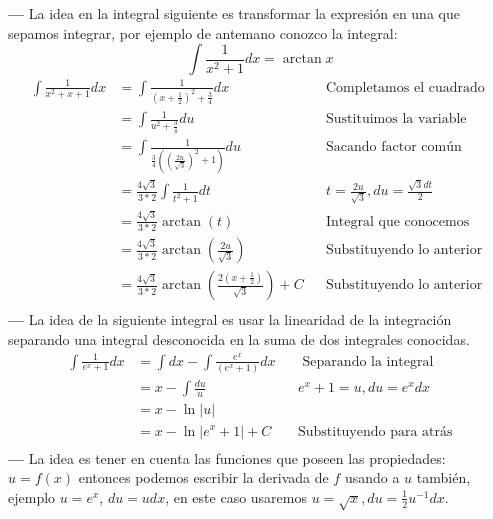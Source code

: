\documentclass[14pt]{extarticle}
\begin{document}
\textbf{---} La idea en la integral siguiente es transformar la expresión en una que sepamos integrar, por ejemplo de antemano conozco la integral: $$\int \frac{1}{x^2+1}dx = \arctan{x}$$
\begin{align}
      \int \frac{1}{x^2+x+1} dx
       & = \int \frac{1}{(x+\frac{1}{2})^2+\frac{3}{4}}dx                           &  & \text{Completamos el cuadrado }                             \\
       & = \int \frac{1}{u^2+\frac{3}{4}}du                                         &  & \text{Sustituimos la variable}                              \\
       & = \int \frac{1}{ \frac{3}{4} \left( (\frac{2u}{\sqrt 3})^2 + 1 \right) }du &  & \text{Sacando factor común}                                 \\
       & = \frac{4\sqrt{3}}{3*2} \int \frac{1}{t^2+1}dt                             &  & \text{$t = \frac{2u}{\sqrt{3}}, du = \frac{\sqrt{3}dt}{2}$} \\
       & = \frac{4\sqrt{3}}{3*2} \arctan(t)                                         &  & \text{Integral que conocemos}                               \\
       & = \frac{4\sqrt{3}}{3*2} \arctan(\frac{2u}{\sqrt{3}})                       &  & \text{Substituyendo lo anterior}                            \\
       & =  \frac{4\sqrt{3}}{3*2} \arctan(\frac{2(x+\frac{1}{2})}{\sqrt{3}}) + C    &  & \text{Substituyendo lo anterior}                            \\
\end{align}
\textbf{---} La idea de la siguiente integral es usar la linearidad de la integración separando una integral desconocida en la suma de dos integrales conocidas.
\begin{align}
      \int \frac{1}{e^x+1} dx
       & = \int dx - \int \frac{e^x}{(e^x+1)}dx &  & \text{ Separando la integral }  \\
       & = x - \int \frac{du}{u}                &  & \text{$e^x+1 = u, du = e^xdx$}  \\
       & = x - \ln{\vert u \vert }                                                   \\
       & = x -  \ln{\vert e^x+1     \vert} + C  &  & \text{Substituyendo para atrás} \\
\end{align}
\textbf{---} La idea es tener en cuenta las funciones que poseen las propiedades: $u = f(x)$ entonces podemos escribir la derivada de $f$ usando a $u$ también, ejemplo $u = e^x$, $du = udx$, en este caso usaremos $u = \sqrt{x},  du = \frac{1}{2}u^{-1}dx$.
\end{document}
